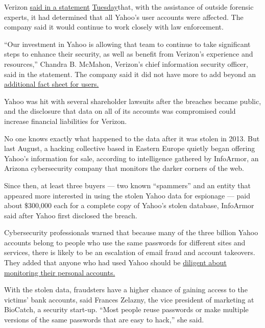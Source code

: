 Verizon
\href{https://www.oath.com/press/yahoo-provides-notice-to-additional-users-affected-by-previously/}{said
in a statement}
\href{https://www.oath.com/press/yahoo-provides-notice-to-additional-users-affected-by-previously/}{Tuesday}that,
with the assistance of outside forensic experts, it had determined that
all Yahoo's user accounts were affected. The company said it would
continue to work closely with law enforcement.

``Our investment in Yahoo is allowing that team to continue to take
significant steps to enhance their security, as well as benefit from
Verizon's experience and resources,'' Chandra B. McMahon, Verizon's
chief information security officer, said in the statement. The company
said it did not have more to add beyond an
\href{https://help.yahoo.com/kb/account/SLN28451.html?impressions=true}{additional
fact sheet for users.}

Yahoo was hit with several shareholder lawsuits after the breaches
became public, and the disclosure that data on all of its accounts was
compromised could increase financial liabilities for Verizon.

No one knows exactly what happened to the data after it was stolen in
2013. But last August, a hacking collective based in Eastern Europe
quietly began offering Yahoo's information for sale, according to
intelligence gathered by InfoArmor, an Arizona cybersecurity company
that monitors the darker corners of the web.

Since then, at least three buyers --- two known ``spammers'' and an
entity that appeared more interested in using the stolen Yahoo data for
espionage --- paid about \$300,000 each for a complete copy of Yahoo's
stolen database, InfoArmor said after Yahoo first disclosed the breach.

Cybersecurity professionals warned that because many of the three
billion Yahoo accounts belong to people who use the same passwords for
different sites and services, there is likely to be an escalation of
email fraud and account takeovers. They added that anyone who had used
Yahoo should be
\href{https://www.nytimes.com/interactive/2017/technology/how-to-protect-data-online.html}{diligent
about monitoring their personal accounts.}

With the stolen data, fraudsters have a higher chance of gaining access
to the victims' bank accounts, said Frances Zelazny, the vice president
of marketing at BioCatch, a security start-up. ``Most people reuse
passwords or make multiple versions of the same passwords that are easy
to hack,'' she said.

